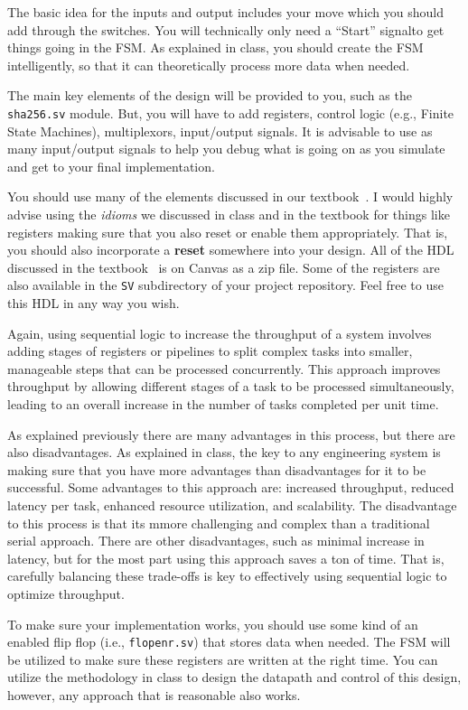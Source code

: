 \documentclass{article}
\begin{document}
The basic idea for the inputs and output includes your move which you
should add through the switches.  You will technically only need a
``Start'' signalto get things going in the FSM.  As explained in
class, you should create the FSM intelligently, so that it can
theoretically process more data when needed.

The main key elements of the design will be provided to you, such as
the \verb!sha256.sv! module.  But, you will have to add registers,
control logic (e.g., Finite State Machines), multiplexors, input/output signals.
It is advisable to use as many input/output signals to help you debug
what is going on as you simulate and get to your final
implementation.

You should use many of the elements discussed in our
textbook~\cite{ddca-riscv}.  I would highly advise using the
\textit{idioms} we discussed in class 
and in the textbook for things
like registers making sure that you also reset or enable them appropriately.
That is, you should also incorporate a \textbf{reset} somewhere into your
design.  All of the HDL discussed in the textbook~\cite{ddca-riscv} is
on Canvas as a zip file.  Some of the registers are also available in
the \verb!SV! subdirectory of your project repository.
Feel free to use this HDL in any way you wish.

Again, using sequential logic to increase the throughput of a system involves
adding stages of registers or pipelines to split complex tasks into
smaller, manageable steps that can be processed concurrently. This
approach improves throughput by allowing different stages of a task to
be processed simultaneously, leading to an overall increase in the
number of tasks completed per unit time.

As explained previously there are many advantages in this process, but
there are also disadvantages.  As explained in class, the key to any
engineering system is making sure that you have more advantages than
disadvantages for it to be successful.  Some advantages to this
approach are: increased throughput, reduced latency per task, enhanced
resource utilization, and scalability.  The disadvantage to this
process is that its mmore challenging and complex than a traditional
serial approach.  There are other disadvantages, such as minimal
increase in latency, but for the most part using this approach saves a
ton of time.  That is, carefully balancing these trade-offs is key to
effectively using sequential logic to optimize throughput.

To make sure your implementation works, you should use some kind of an
enabled flip
flop (i.e., \verb!flopenr.sv!) that stores data when needed.
The FSM will be utilized to make sure these registers are written at
the right time.  You can utilize the methodology in class to design
the datapath and control of this design, however, any approach that is
reasonable also works.
\end{document}
